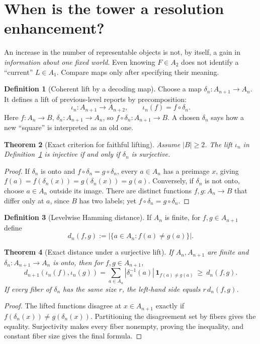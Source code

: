 \documentclass[11pt]{article}
\newtheorem{theorem}{Theorem}[section]
\theoremstyle{definition}
\newtheorem{definition}[theorem]{Definition}
\begin{document}
\section{When is the tower a resolution enhancement?}
An increase in the number of representable objects is not, by itself, a gain in \emph{information about one fixed world}. Even knowing $F\in A_2$ does not identify a ``current'' $L\in A_1$. Compare maps only after specifying their meaning.
\begin{definition}[Coherent lift by a decoding map]\label{def:lift}
Choose a map $\delta_n:A_{n+1}\to A_n$. It defines a lift of previous-level reports by precomposition:
\[
\iota_n:A_{n+1}\to A_{n+2},\qquad \iota_n(f)=f\circ\delta_n.
\]
Here $f:A_n\to B$, $\delta_n:A_{n+1}\to A_n$, so $f\circ\delta_n:A_{n+1}\to B$. A chosen $\delta_n$ says how a new ``square'' is interpreted as an old one.
\end{definition}
\begin{theorem}[Exact criterion for faithful lifting]\label{thm:injective}
Assume $|B|\ge2$. The lift $\iota_n$ in Definition~\ref{def:lift} is injective if and only if $\delta_n$ is surjective.
\end{theorem}
\begin{proof}If $\delta_n$ is onto and $f\circ\delta_n=g\circ\delta_n$, every $a\in A_n$ has a preimage $x$, giving $f(a)=f(\delta_n(x))=g(\delta_n(x))=g(a)$. Conversely, if $\delta_n$ is not onto, choose $a\in A_n$ outside its image. There are distinct functions $f,g:A_n\to B$ that differ only at $a$, since $B$ has two labels; yet $f\circ\delta_n=g\circ\delta_n$.\end{proof}
\begin{definition}[Levelwise Hamming distance]
If $A_n$ is finite, for $f,g\in A_{n+1}$ define
\[
d_n(f,g):=|\{a\in A_n:f(a)\ne g(a)\}|.
\]
\end{definition}
\begin{theorem}[Exact distance under a surjective lift]\label{thm:distance}
If $A_n,A_{n+1}$ are finite and $\delta_n:A_{n+1}\to A_n$ is onto, then for $f,g\in A_{n+1}$,
\[
\boxed{d_{n+1}(\iota_n(f),\iota_n(g))
=\sum_{a\in A_n}|\delta_n^{-1}(a)|\,\mathbf 1_{f(a)\ne g(a)}\ \ge\ d_n(f,g).}
\]
If every fiber of $\delta_n$ has the same size $r$, the left-hand side equals $r\,d_n(f,g)$.
\end{theorem}
\begin{proof}The lifted functions disagree at $x\in A_{n+1}$ exactly if $f(\delta_n(x))\ne g(\delta_n(x))$. Partitioning the disagreement set by fibers gives the equality. Surjectivity makes every fiber nonempty, proving the inequality, and constant fiber size gives the final formula.\end{proof}
\end{document}
